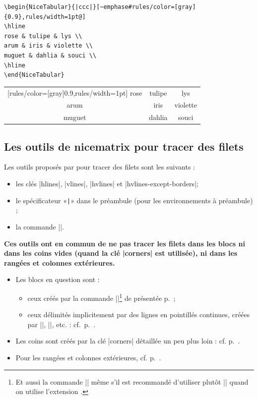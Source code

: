 \documentclass[dvipsnames]{article}%
\begin{document}
\medskip
\begin{scope}
\hfuzz=10cm
\begin{BVerbatim}[baseline=c,boxwidth=9.5cm]
\begin{NiceTabular}{|ccc|}[~emphase#rules/color=[gray]{0.9},rules/width=1pt@]
\hline
rose & tulipe & lys \\
arum & iris & violette \\
muguet & dahlia & souci \\
\hline
\end{NiceTabular}
\end{BVerbatim}
\begin{NiceTabular}{|ccc|}[rules/color=[gray]{0.9},rules/width=1pt]
\hline
rose & tulipe & lys \\
arum & iris & violette \\
muguet & dahlia & souci \\
\hline
\end{NiceTabular}
\end{scope}



\medskip
\subsection{Les outils de nicematrix pour tracer des filets}

Les outils proposés par  pour tracer des filets sont les
suivants :
\begin{itemize}
\item les clés |hlines|, |vlines|, |hvlines| et |hvlines-except-borders|;
\item le spécificateur «\verb+|+» dans le préambule (pour les environnements à
préambule) ;
\item la commande |\Hline|.
\end{itemize}

\medskip
\textbf{Ces outils ont en commun de ne pas tracer les filets dans les blocs ni
  dans les coins vides (quand la clé |corners| est utilisée), ni dans les
  rangées et colonnes extérieures.}
\begin{itemize}
\item Les blocs en question sont :
\begin{itemize}
\item ceux créés par la commande |\Block|\footnote{Et aussi la commande |\multicolumn| même s'il
  est recommandé d'utiliser plutôt |\Block| quand on utilise l'extension
  .} de  présentée
p.~\pageref{Block};
\item ceux délimités implicitement par des lignes en pointillés continues, créées
par |\Cdots|, |\Vdots|, etc. : cf.~p.~\pageref{Cdots}.
\end{itemize}
\item Les coins sont créés par la clé |corners| détaillée un peu plus loin : cf.
p.~\pageref{corners}.
\item Pour les rangées et colonnes extérieures, cf. p.~\pageref{exterior}.
\end{itemize}
\end{document}
